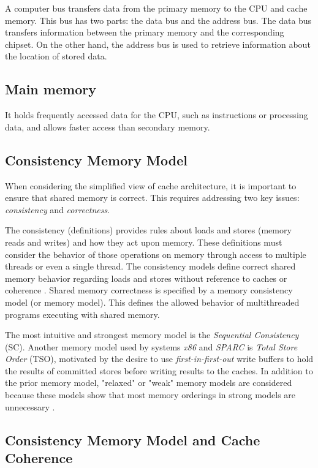 A computer bus transfers data from the primary memory to the CPU and cache memory. This bus has two parts: the data bus and the address bus. The data bus transfers information between the primary memory and the corresponding chipset. On the other hand, the address bus is used to retrieve information about the location of stored data.

\subsection{Main memory}
\label{sec:orgf1a7f27}

It holds frequently accessed data for the CPU, such as instructions or processing data, and allows faster access than secondary memory.

\subsection{Consistency Memory Model}

When considering the simplified view of cache architecture, it is important to ensure that shared memory is correct. This requires addressing two key issues: \emph{consistency} and \emph{correctness}.

The consistency (definitions) provides rules about loads and stores (memory
reads and writes) and how they act upon memory. These definitions must consider the behavior of those operations on memory through access to multiple threads or even a single thread. The consistency models define correct shared memory behavior regarding loads and stores without reference to caches or coherence \cite{DBLP_series_synthesis_2020Nagarajan}. Shared memory correctness is specified by a memory consistency model (or memory model). This defines the allowed behavior of multithreaded programs executing with shared memory.

The most intuitive and strongest memory model is the \emph{Sequential Consistency} (SC). Another memory model used by systems \emph{x86} and \emph{SPARC} is \emph{Total Store Order} (TSO), motivated by the desire to use \emph{first-in-first-out} write buffers to hold the results of committed stores before writing results to the caches. In addition to the prior memory model, "relaxed" or "weak" memory models are considered because these models show that most memory orderings in strong models are unnecessary \cite{DBLP_series_synthesis_2020Nagarajan}.

\subsection{Consistency Memory Model and Cache Coherence}
\label{sec:orge62077c}

